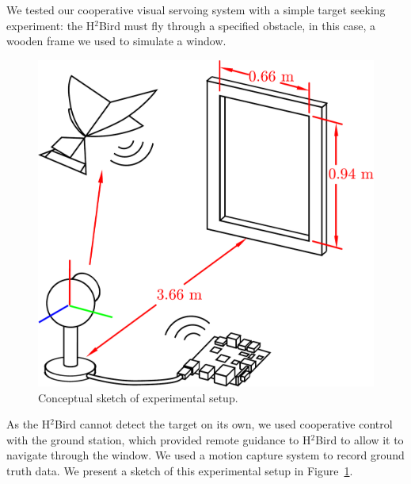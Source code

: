 \documentclass{aamas2013}
\begin{document}
We tested our cooperative visual servoing system with a simple target seeking
experiment: the H$^2$Bird must fly through a specified obstacle, in this 
case, a wooden frame we used to simulate a window.

\begin{figure}[tb]
\centering
\includegraphics[width=\linewidth]{figures/experiment_cartoon.pdf}
\caption{Conceptual sketch of experimental setup.}
\label{fig:experiment_cartoon}
\end{figure}

As the H$^2$Bird cannot detect the target on its own, we used cooperative 
control with the ground station, which provided remote guidance to 
H$^2$Bird to allow it to navigate through the window. We used a motion capture 
system to record ground truth data. We present a sketch of this experimental 
setup in Figure~\ref{fig:experiment_cartoon}.
\end{document}

